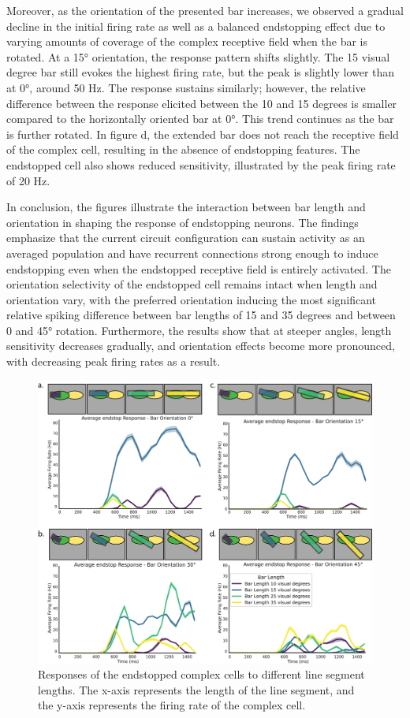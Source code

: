\documentclass[12pt]{article}
\begin{document}
Moreover, as the orientation of the presented bar increases, we observed a gradual decline in the initial firing rate as well as a balanced endstopping effect due to varying amounts of coverage of the complex receptive field when the bar is rotated. At a 15° orientation, the response pattern shifts slightly. The 15 visual degree bar still evokes the highest firing rate, but the peak is slightly lower than at 0°, around 50 Hz. The response sustains similarly; however, the relative difference between the response elicited between the 10 and 15 degrees is smaller compared to the horizontally oriented bar at 0°. This trend continues as the bar is further rotated. In figure d, the extended bar does not reach the receptive field of the complex cell, resulting in the absence of endstopping features. The endstopped cell also shows reduced sensitivity, illustrated by the peak firing rate of 20 Hz.

In conclusion, the figures illustrate the interaction between bar length and orientation in shaping the response of endstopping neurons. The findings emphasize that the current circuit configuration can sustain activity as an averaged population and have recurrent connections strong enough to induce endstopping even when the endstopped receptive field is entirely activated. The orientation selectivity of the endstopped cell remains intact when length and orientation vary, with the preferred orientation inducing the most significant relative spiking difference between bar lengths of 15 and 35 degrees and between 0 and 45° rotation. Furthermore, the results show that at steeper angles, length sensitivity decreases gradually, and orientation effects become more pronounced, with decreasing peak firing rates as a result.


\begin{figure}[H]
    \centering
    \includegraphics[width=1 \textwidth]{./figures/LIF_endstopping_length_orientation.png}
    \caption{Responses of the endstopped complex cells to different line segment lengths. The x-axis represents the length of the line segment, and the y-axis represents the firing rate of the complex cell.}
    \label{fig:endstopping}
\end{figure}
\end{document}
